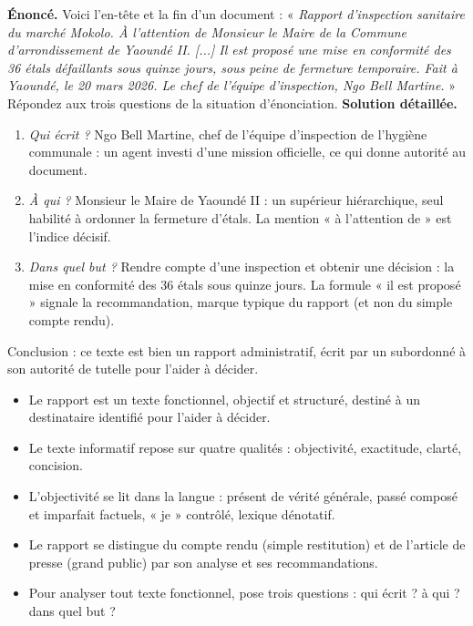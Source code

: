 \documentclass[11pt]{article}
\newcommand{\cle}[1]{{\popxbold\color{popdark}#1}}
\newcounter{popsec}
\newcounter{popsub}
\newcommand{\courssub}[1]{%
  \stepcounter{popsub}%
  \par\vspace{9pt}\noindent{\popxbold\fontsize{11.5}{13}\selectfont\color{popink}{\color{poporange}\thepopsec.\thepopsub}\hspace{6pt}#1}\par\nopagebreak\vspace{4pt}
}
\begin{document}
\begin{exoresolu}
\textbf{Énoncé.} Voici l'en-tête et la fin d'un document : « \emph{Rapport d'inspection sanitaire du marché Mokolo. À l'attention de Monsieur le Maire de la Commune d'arrondissement de Yaoundé II. [...] Il est proposé une mise en conformité des 36 étals défaillants sous quinze jours, sous peine de fermeture temporaire. Fait à Yaoundé, le 20 mars 2026. Le chef de l'équipe d'inspection, Ngo Bell Martine.} » Répondez aux trois questions de la situation d'énonciation.
\tcblower
\textbf{Solution détaillée.}
\begin{enumerate}
\item \emph{Qui écrit ?} Ngo Bell Martine, chef de l'équipe d'inspection de l'hygiène communale : un agent investi d'une mission officielle, ce qui donne autorité au document.
\item \emph{À qui ?} Monsieur le Maire de Yaoundé II : un supérieur hiérarchique, seul habilité à ordonner la fermeture d'étals. La mention « à l'attention de » est l'indice décisif.
\item \emph{Dans quel but ?} Rendre compte d'une inspection et obtenir une décision : la mise en conformité des 36 étals sous quinze jours. La formule « il est proposé » signale la recommandation, marque typique du rapport (et non du simple compte rendu).
\end{enumerate}
Conclusion : ce texte est bien un rapport administratif, écrit par un subordonné à son autorité de tutelle pour l'aider à décider.
\end{exoresolu}

\courssub{Bilan de la section et ouverture}

\begin{aretenir}[L'essentiel]
\begin{itemize}
\item Le \cle{rapport} est un texte fonctionnel, objectif et structuré, destiné à un destinataire identifié pour l'aider à décider.
\item Le \cle{texte informatif} repose sur quatre qualités : objectivité, exactitude, clarté, concision.
\item L'objectivité se lit dans la langue : présent de vérité générale, passé composé et imparfait factuels, « je » contrôlé, lexique dénotatif.
\item Le rapport se distingue du compte rendu (simple restitution) et de l'article de presse (grand public) par son analyse et ses recommandations.
\item Pour analyser tout texte fonctionnel, pose trois questions : qui écrit ? à qui ? dans quel but ?
\end{itemize}
\end{aretenir}
\end{document}
